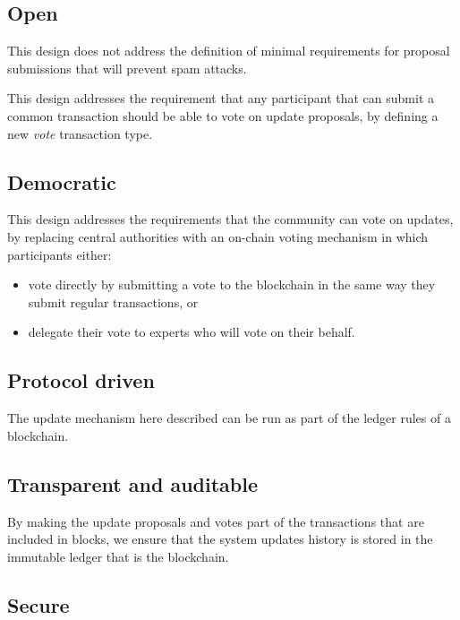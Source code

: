 \documentclass[11pt,a4paper]{article}
\begin{document}

\subsection{Open}
\label{sec:sat-open}

This design does not address the definition of minimal requirements for proposal
submissions that will prevent spam attacks.

This design addresses the requirement that any participant that can submit a
common transaction should be able to vote on update proposals, by
defining a new \emph{vote} transaction type.

\subsection{Democratic}
\label{sec:sat-decentr-decis-making}

This design addresses the requirements that the community can vote on updates,
by replacing central authorities with an on-chain voting mechanism in which
participants either:
\begin{itemize}
\item vote directly by submitting a vote to the blockchain in the same way they
  submit regular transactions, or
\item delegate their vote to experts who will vote on their behalf.
\end{itemize}

\subsection{Protocol driven}
\label{sec:sat-protocol-driven}

The update mechanism here described can be run as part of the ledger rules of a
blockchain.

\subsection{Transparent and auditable}
\label{sec:sat-transp-audit}

By making the update proposals and votes part of the transactions that are
included in blocks, we ensure that the system updates history is stored in the
immutable ledger that is the blockchain.

\subsection{Secure}
\label{sec:sat-secure}
\end{document}
